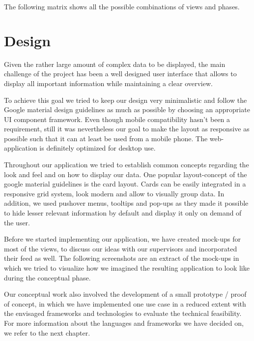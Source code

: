 The following matrix shows all the possible combinations of views and phases.

\section{Design}
Given the rather large amount of complex data to be displayed, the main challenge of the project has been a well designed user interface that allows to display all important information while maintaining a clear overview.

To achieve this goal we tried to keep our design very minimalistic and follow the Google material design guidelines as much as possible by choosing an appropriate UI component framework. Even though mobile compatibility hasn't been a requirement, still it was nevertheless our goal to make the layout as responsive as possible such that it can at least be used from a mobile phone. The web-application is definitely optimized for desktop use.

Throughout our application we tried to establish common concepts regarding the look and feel and on how to display our data. One popular layout-concept of the google material guidelines is the card layout. Cards can be easily integrated in a responsive grid system, look modern and allow to visually group data. In addition, we used pushover menus, tooltips and pop-ups as they made it possible to hide lesser relevant information by default and display it only on demand of the user.

Before we started implementing our application, we have created mock-ups for most of the views, to discuss our ideas with our supervisors and incorporated their feed as well. The following screenshots are an extract of the mock-ups in which we tried to visualize how we imagined the resulting application to look like during the conceptual phase.


Our conceptual work also involved the development of a small prototype / proof of concept, in which we have implemented one use case in a reduced extent with the envisaged frameworks and technologies to evaluate the technical feasibility. For more information about the languages and frameworks we have decided on, we refer to the next chapter.
